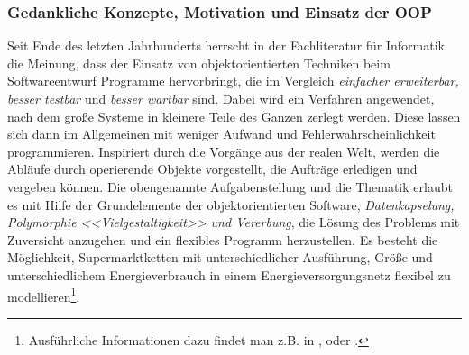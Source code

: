 \subsubsection*{Gedankliche Konzepte, Motivation und Einsatz der OOP}
Seit Ende des letzten Jahrhunderts herrscht in der Fachliteratur für Informatik die Meinung, dass der Einsatz von
objektorientierten Techniken beim Softwareentwurf Programme hervorbringt, die im Vergleich \textit{einfacher erweiterbar,
besser testbar} und \textit{besser wartbar} sind. Dabei wird ein Verfahren angewendet, nach
dem große Systeme in kleinere Teile des Ganzen zerlegt werden. Diese lassen sich dann im Allgemeinen mit weniger Aufwand und
Fehlerwahrscheinlichkeit programmieren. Inspiriert durch die Vorgänge aus der realen Welt, werden die Abläufe durch
operierende Objekte vorgestellt, die Aufträge erledigen und vergeben können.  Die obengenannte Aufgabenstellung und die
Thematik erlaubt es mit Hilfe der Grundelemente der objektorientierten Software,
\textit{Datenkapselung, Polymorphie <<Vielgestaltigkeit>> und Vererbung}, die Lösung des Problems mit Zuversicht anzugehen
und ein flexibles Programm herzustellen. Es besteht die Möglichkeit, Supermarktketten mit unterschiedlicher Ausführung, Größe
und unterschiedlichem Energieverbrauch in einem Energieversorgungsnetz flexibel zu modellieren\footnote{ Ausführliche
Informationen dazu findet man z.B. in \cite{OOP},\cite{java} oder \cite{python}.}.



